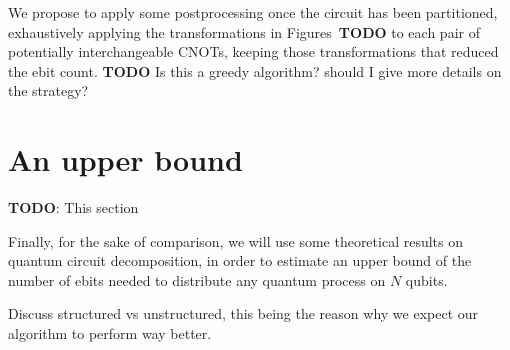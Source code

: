We propose to apply some postprocessing once the circuit has been partitioned, exhaustively applying the transformations in Figures~\textbf{TODO} to each pair of potentially interchangeable CNOTs, keeping those transformations that reduced the ebit count. \textbf{TODO} Is this a greedy algorithm? should I give more details on the strategy?

\section{An upper bound}

\textbf{TODO}: This section

Finally, for the sake of comparison, we will use some theoretical results on quantum circuit decomposition, in order to estimate an upper bound of the number of ebits needed to distribute any quantum process on \(N\) qubits.

Discuss structured vs unstructured, this being the reason why we expect our algorithm to perform way better.
